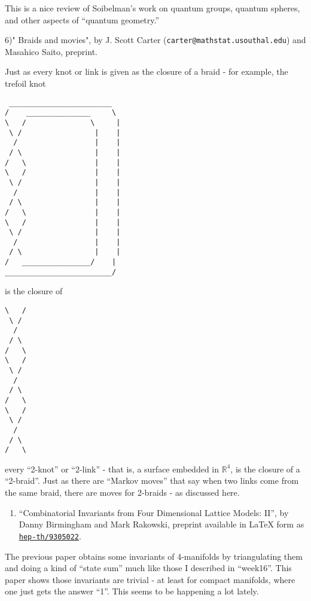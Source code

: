 \documentclass{article}
\def\tightlist{}
\begin{document}
This is a nice review of Soibelman's work on quantum groups, quantum
spheres, and other aspects of ``quantum geometry.''

6)" Braids and movies", by J. Scott Carter
(\texttt{carter@mathstat.usouthal.edu}) and Masahico Saito, preprint.

Just as every knot or link is given as the closure of a braid - for
example, the trefoil knot

\begin{verbatim}
 ________________________
/    _______________     \ 
\   /               \     |
 \ /                 |    |
  /                  |    |    
 / \                 |    |
/   \                |    |
\   /                |    |
 \ /                 |    |
  /                  |    |    
 / \                 |    |
/   \                |    |
\   /                |    |
 \ /                 |    |
  /                  |    |    
 / \                 |    |
/   ________________/    |
_________________________/
\end{verbatim}

is the closure of

\begin{verbatim}
\   /       
 \ /        
  /         
 / \        
/   \       
\   /       
 \ /        
  /         
 / \        
/   \       
\   /       
 \ /        
  /         
 / \        
/   \ 
\end{verbatim}

every ``2-knot'' or ``2-link'' - that is, a surface embedded in
\(\mathbb{R}^4\), is the closure of a ``2-braid''. Just as there are
``Markov moves'' that say when two links come from the same braid, there
are moves for 2-braids - as discussed here.

\begin{enumerate}
\def\labelenumi{\arabic{enumi})}
\setcounter{enumi}{6}
\tightlist
\item
  ``Combinatorial Invariants from Four Dimensional Lattice Models: II'',
  by Danny Birmingham and Mark Rakowski, preprint available in LaTeX
  form as
  \href{http://xxx.lanl.gov/abs/hep-th/9305022}{\texttt{hep-th/9305022}}.
\end{enumerate}

The previous paper obtains some invariants of 4-manifolds by
triangulating them and doing a kind of ``state sum'' much like those I
described in ``week16''. This paper shows those invariants are trivial -
at least for compact manifolds, where one just gets the answer ``1''.
This seems to be happening a lot lately.
\end{document}
